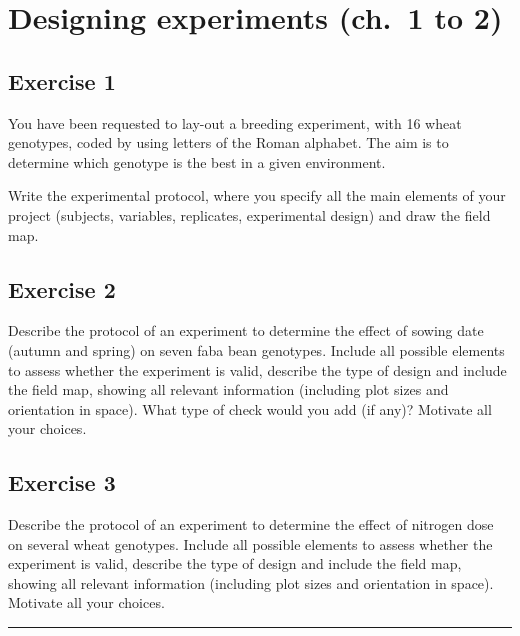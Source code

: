 \documentclass[a4paper,12pt,oneside]{book}
\begin{document}
\hypertarget{designing-experiments-ch.-1-to-2}{%
\section{Designing experiments (ch.~1 to 2)}\label{designing-experiments-ch.-1-to-2}}

\hypertarget{exercise-1}{%
\subsection{Exercise 1}\label{exercise-1}}

You have been requested to lay-out a breeding experiment, with 16 wheat genotypes, coded by using letters of the Roman alphabet. The aim is to determine which genotype is the best in a given environment.

Write the experimental protocol, where you specify all the main elements of your project (subjects, variables, replicates, experimental design) and draw the field map.

\hypertarget{exercise-2}{%
\subsection{Exercise 2}\label{exercise-2}}

Describe the protocol of an experiment to determine the effect of sowing date (autumn and spring) on seven faba bean genotypes. Include all possible elements to assess whether the experiment is valid, describe the type of design and include the field map, showing all relevant information (including plot sizes and orientation in space). What type of check would you add (if any)? Motivate all your choices.

\hypertarget{exercise-3}{%
\subsection{Exercise 3}\label{exercise-3}}

Describe the protocol of an experiment to determine the effect of nitrogen dose on several wheat genotypes. Include all possible elements to assess whether the experiment is valid, describe the type of design and include the field map, showing all relevant information (including plot sizes and orientation in space). Motivate all your choices.

\begin{center}\rule{0.5\linewidth}{0.5pt}\end{center}
\end{document}
